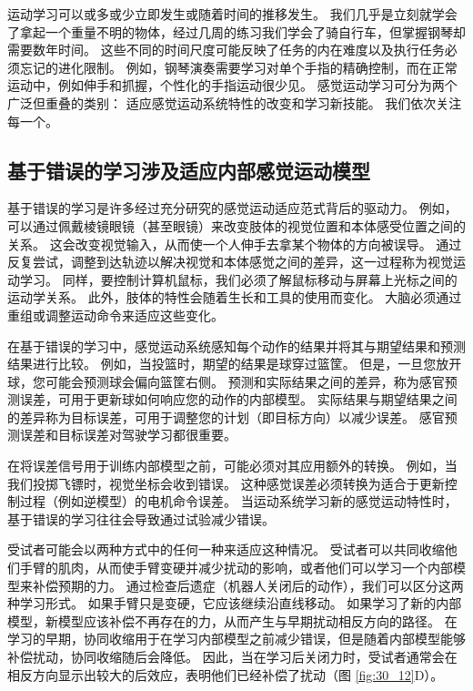 运动学习可以或多或少立即发生或随着时间的推移发生。
我们几乎是立刻就学会了拿起一个重量不明的物体，经过几周的练习我们学会了骑自行车，但掌握钢琴却需要数年时间。
这些不同的时间尺度可能反映了任务的内在难度以及执行任务必须忘记的进化限制。
例如，钢琴演奏需要学习对单个手指的精确控制，而在正常运动中，例如伸手和抓握，个性化的手指运动很少见。
感觉运动学习可分为两个广泛但重叠的类别：
适应感觉运动系统特性的改变和学习新技能。
我们依次关注每一个。


\subsection{基于错误的学习涉及适应内部感觉运动模型}

基于错误的学习是许多经过充分研究的感觉运动适应范式背后的驱动力。
例如，可以通过佩戴棱镜眼镜（甚至眼镜）来改变肢体的视觉位置和本体感受位置之间的关系。
这会改变视觉输入，从而使一个人伸手去拿某个物体的方向被误导。
通过反复尝试，调整到达轨迹以解决视觉和本体感觉之间的差异，这一过程称为视觉运动学习。
同样，要控制计算机鼠标，我们必须了解鼠标移动与屏幕上光标之间的运动学关系。
此外，肢体的特性会随着生长和工具的使用而变化。
大脑必须通过重组或调整运动命令来适应这些变化。


在基于错误的学习中，感觉运动系统感知每个动作的结果并将其与期望结果和预测结果进行比较。
例如，当投篮时，期望的结果是球穿过篮筐。
但是，一旦您放开球，您可能会预测球会偏向篮筐右侧。
预测和实际结果之间的差异，称为感官预测误差，可用于更新球如何响应您的动作的内部模型。
实际结果与期望结果之间的差异称为目标误差，可用于调整您的计划（即目标方向）以减少误差。
感官预测误差和目标误差对驾驶学习都很重要。


在将误差信号用于训练内部模型之前，可能必须对其应用额外的转换。
例如，当我们投掷飞镖时，视觉坐标会收到错误。
这种感觉误差必须转换为适合于更新控制过程（例如逆模型）的电机命令误差。
当运动系统学习新的感觉运动特性时，基于错误的学习往往会导致通过试验减少错误。


受试者可能会以两种方式中的任何一种来适应这种情况。
受试者可以共同收缩他们手臂的肌肉，从而使手臂变硬并减少扰动的影响，或者他们可以学习一个内部模型来补偿预期的力。
通过检查后遗症（机器人关闭后的动作），我们可以区分这两种学习形式。
如果手臂只是变硬，它应该继续沿直线移动。
如果学习了新的内部模型，新模型应该补偿不再存在的力，从而产生与早期扰动相反方向的路径。
在学习的早期，协同收缩用于在学习内部模型之前减少错误，但是随着内部模型能够补偿扰动，协同收缩随后会降低。
因此，当在学习后关闭力时，受试者通常会在相反方向显示出较大的后效应，表明他们已经补偿了扰动（图 \ref{fig:30_12}D）。


